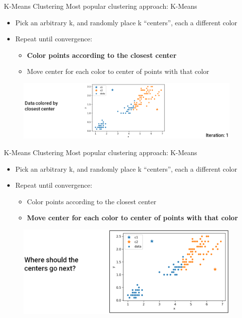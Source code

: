 \documentclass[aspectratio=169]{../latex_main/tntbeamer}  %
\begin{document}
	
	\begin{frame}{K-Means Clustering}
	    Most popular clustering approach: K-Means
	    \begin{itemize}
	        \item Pick an arbitrary k, and randomly place k “centers”, each a different color
	        \item Repeat until convergence:
	        \begin{itemize}
	            \item \textbf{Color points according to the closest center}
	            \item Move center for each color to center of points with that color
	        \end{itemize}
	    \end{itemize}
	    \begin{figure}
	        \centering
	        \includegraphics[scale=.38]{Bild9}
	    \end{figure}
	\end{frame}
	
	
	\begin{frame}{K-Means Clustering}
	    Most popular clustering approach: K-Means
	    \begin{itemize}
	        \item Pick an arbitrary k, and randomly place k “centers”, each a different color
	        \item Repeat until convergence:
	        \begin{itemize}
	            \item Color points according to the closest center
	            \item \textbf{Move center for each color to center of points with that color}
	        \end{itemize}
	    \end{itemize}
	    \begin{figure}
	        \centering
	        \includegraphics[scale=.4]{Bild10}
	    \end{figure}
	\end{frame}
	
\end{document}
